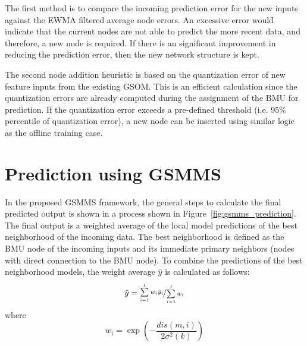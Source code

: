 \documentclass[review,3p]{elsarticle}
\renewcommand\[{\begin{equation}}
\renewcommand\]{\end{equation}}
\begin{document}
The first method is to compare the incoming prediction error for the new inputs against the EWMA filtered average node errors. An excessive error would indicate that the current nodes are not able to predict the more recent data, and therefore, a new node is required. If there is an significant
improvement in reducing the prediction error, then the new network structure
is kept.

The second node addition heuristic is based on the quantization error of new feature inputs
from the existing GSOM. This is an efficient calculation
since the quantization errors are already computed during the assignment of the BMU for prediction.
If the quantization error exceeds a pre-defined threshold (i.e. 95\% percentile of quantization error), 
a new node can be inserted using similar logic as the offline training case.


\section{Prediction using GSMMS}

In the proposed GSMMS framework, the general steps to calculate the final predicted output is shown in a process shown in Figure~\ref{fig:gsmms_prediction}. The final output is a weighted average of the local model predictions of the best neighborhood of the incoming data. The best neighborhood is defined as the BMU node of the incoming inputs and its immediate primary neighbors (nodes with direct connection to the BMU node). To combine the predictions of the best neighborhood models, the weight average $\hat y$ is calculated as follows:
\[
\hat y = \nicefrac{{\sum\limits_{i = 1}^I {{w_i}{{\hat y}_i}} }}{{\sum\limits_{i = 1}^I {{w_i}} }}
\]
where
\[
{w_i} = \exp \left( { - \frac{{dis\left( {m,i} \right)}}{{2{\sigma ^2}\left( k \right)}}} \right)
\]
\end{document}
